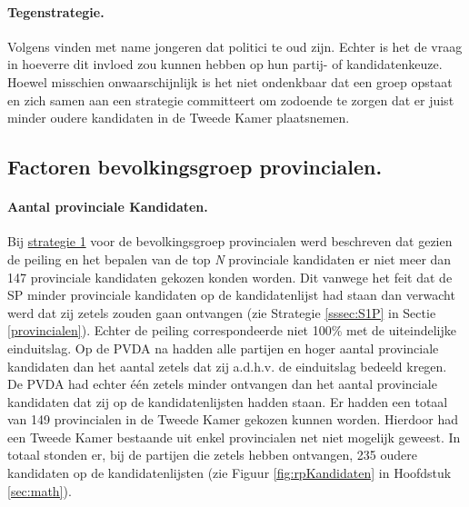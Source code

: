 \paragraph{Tegenstrategie.}
Volgens \cite{aalberts2006aantrekkelijke} vinden met name jongeren dat politici te oud zijn. Echter is het de vraag in hoeverre dit invloed zou kunnen hebben op hun partij- of kandidatenkeuze. Hoewel misschien onwaarschijnlijk is het niet ondenkbaar dat een groep opstaat en zich samen aan een strategie committeert om zodoende te zorgen dat er juist minder oudere kandidaten in de Tweede Kamer plaatsnemen. 

\subsection{Factoren bevolkingsgroep provincialen.}
\label{percP}

\paragraph{Aantal provinciale Kandidaten.} 
Bij \hyperref[S1A]{strategie 1} voor de bevolkingsgroep provincialen werd beschreven dat gezien de peiling en het bepalen van de top \textit{N} provinciale kandidaten er niet meer dan 147 provinciale kandidaten gekozen konden worden. Dit vanwege het feit dat de SP minder provinciale kandidaten op de kandidatenlijst had staan dan verwacht werd dat zij zetels zouden gaan ontvangen (zie Strategie \ref{sssec:S1P} in Sectie \ref{provincialen}). Echter de peiling correspondeerde niet 100\% met de uiteindelijke einduitslag. Op de PVDA na hadden alle partijen en hoger aantal provinciale kandidaten dan het aantal zetels dat zij a.d.h.v. de einduitslag bedeeld kregen. De PVDA had echter één zetels minder ontvangen dan het aantal provinciale kandidaten dat zij op de kandidatenlijsten hadden staan. Er hadden een totaal van 149 provincialen in de Tweede Kamer gekozen kunnen worden. Hierdoor had een Tweede Kamer bestaande uit enkel provincialen net niet mogelijk geweest. In totaal stonden er, bij de partijen die zetels hebben ontvangen, 235 oudere kandidaten op de kandidatenlijsten (zie Figuur \ref{fig:rpKandidaten} in Hoofdstuk \ref{sec:math}).

